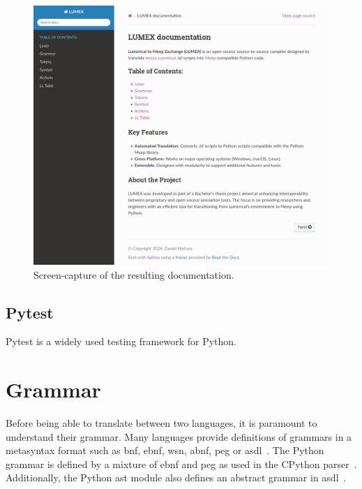 \begin{figure}[H]

  \label{fig:shpinx}
  \centering
  \includegraphics[width=\textwidth]{obrazky-figures/sphinx-lumex.png}
  \caption{Screen-capture of the resulting documentation.}
\end{figure}

\subsection{Pytest}
Pytest is a widely used testing framework for Python. 





\section{Grammar}\label{grammar}
Before being able to translate between two languages, it is paramount to understand their grammar. Many languages provide definitions of grammars in a metasyntax format such as \gls{bnf}, \gls{ebnf}, \gls{wsn}, \gls{abnf}, \gls{peg} or \gls{asdl}~\cite{asdl}. The Python grammar is defined by a mixture of \gls{ebnf} and \gls{peg} as used in the CPython parser~\cite{python3grammar}. Additionally, the Python \gls{ast} module also defines an abstract grammar in \gls{asdl}~\cite{python_ast}.

